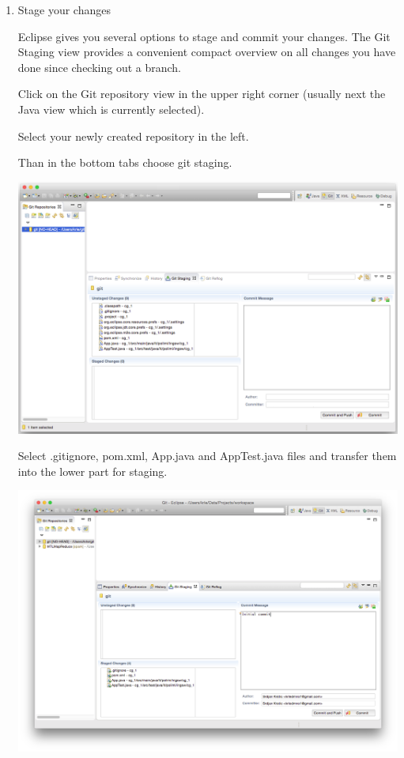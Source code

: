 \documentclass{article}
\begin{document}
\begin{enumerate}
\item Stage your changes

Eclipse gives you several options to stage and commit your
changes. The Git Staging view provides a convenient compact overview
on all changes you have done since checking out a branch.



Click on the Git repository view in the upper right corner (usually
next the Java view which is currently selected).

Select your newly created repository in the left.

Than in the bottom tabs choose git staging.

\begin{center}
\includegraphics[scale=0.33]{figures/s7.png}
\end{center}

Select .gitignore, pom.xml, App.java and AppTest.java files and
transfer them into the lower part for staging.

\begin{center}
\includegraphics[scale=0.33]{figures/s8.png}
\end{center}


\end{enumerate}
\end{document}
